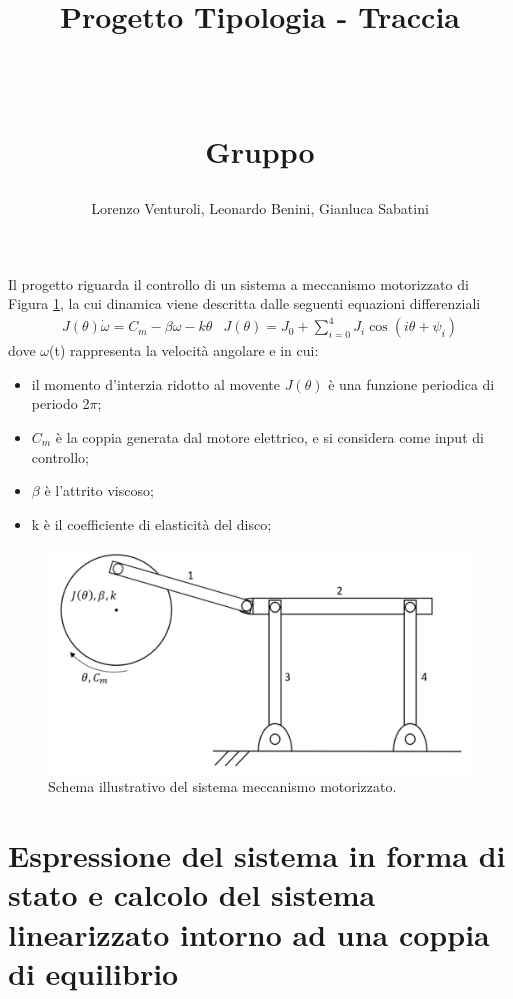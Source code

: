 \documentclass[a4paper, 11pt]{article}
\title{ \vspace{-1in}
		\huge \strut \coursename \strut 
		\\
		\Large  \strut Progetto Tipologia \tipology - Traccia \trace 
		\\
		\Large  \strut \projectname\strut
		\\
		\Large  \strut Gruppo \group\strut
		\vspace{-0.4cm}
}
\author{Lorenzo Venturoli, Leonardo Benini, Gianluca Sabatini}
\date{}
\begin{document}
\maketitle
\vspace{-0.5cm}

Il progetto riguarda il controllo di un sistema a meccanismo motorizzato di Figura \ref{fig:system_image}, la cui dinamica viene descritta dalle seguenti equazioni differenziali  
%
\begin{subequations}\label{eq:system}
	\begin{align}
		J(\theta)\dot{\omega} = C_m - \beta\omega - k\theta 
	\end{align}
	\begin{align}
		J(\theta) = J_0 + \sum_{i = 0}^{4}J_i\cos (i\theta +\psi_i)
	\end{align}
\end{subequations}
%
dove $\omega$(t) rappresenta la velocità angolare e in cui:
\begin{itemize}
	\item il momento d'interzia ridotto al movente $J(\theta)$ è una funzione periodica di periodo 2$\pi$;
	\item $C_m$ è la coppia generata dal motore elettrico, e si considera come input di controllo;
	\item $\beta$ è l'attrito viscoso;
	\item k è il coefficiente di elasticità del disco;
\end{itemize}
%
\begin{figure}[h!]
	\centering
	\includegraphics[width=0.75\linewidth]{./images/system_image.png}
	\caption{Schema illustrativo del sistema meccanismo motorizzato.}
	\label{fig:system_image}
\end{figure}
\section{Espressione del sistema in forma di stato e calcolo del sistema linearizzato intorno ad una coppia di equilibrio}
\end{document}
